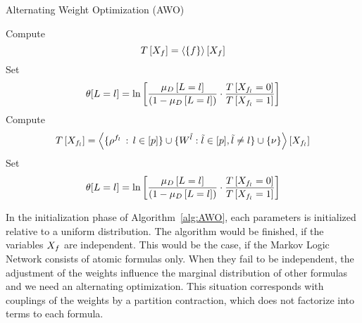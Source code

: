 \begin{algorithm}[hbt!]
\caption{Alternating Weight Optimization (AWO)}\label{alg:AWO}
\begin{algorithmic}
\For{$\exformula\in\formulaset$}
	\State Compute
		\[ T\left[X_{f}\right] = \left\langle \left\{f\right\}\right\rangle \left[ X_{f} \right] \]
	\State Set 
		\begin{align*}
	 		\theta[L=l] = \ln \left[ 
			\frac{\mu_{D}\left[L=l\right]}{(1-\mu_{D}\left[L=l\right])} 
			\cdot \frac{T\left[X_{f_{l}}=0\right]}{T\left[X_{f_{l}}=1\right]} 
			 \right] 
		\end{align*}
\EndFor
{}
\For{$\exformula\in\formulaset$}
	\State Compute
		\begin{align*}
	 	T\left[X_{f_{l}}\right] 
		= \left\langle \{\rho^{f_{l}} \, : \, l\in[p]\}
		\cup\{W^{\tilde{l}} : \tilde{l} \in [p], \tilde{l}\neq l\}
		\cup\{\nu\}\right\rangle \left[ X_{f_{l}} \right]
	\end{align*}
	\State Set 
	\begin{align*}
	 	\theta[L=l] = \ln \left[ 
		\frac{\mu_{D}\left[L=l\right]}{(1-\mu_{D}\left[L=l\right])} 
		\cdot \frac{T\left[X_{f_{l}}=0\right]}{T\left[X_{f_{l}}=1\right]} 
		 \right] 
	\end{align*}
\EndFor
\EndWhile
\end{algorithmic}
\end{algorithm}


In the initialization phase of Algorithm~\ref{alg:AWO}, each parameters is initialized relative to a uniform distribution. 
The algorithm would be finished, if the variables $X_{f}$ are independent.
This would be the case, if the Markov Logic Network consists of atomic formulas only.
When they fail to be independent, the adjustment of the weights influence the marginal distribution of other formulas and we need an alternating optimization.
% 
This situation corresponds with couplings of the weights by a partition contraction, which does not factorize into terms to each formula.


